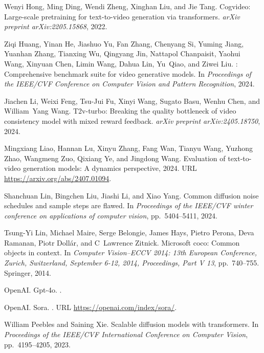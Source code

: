 \documentclass{article} \usepackage{iclr2024_conference,times}
\begin{document}
\begin{thebibliography}{45}
Wenyi Hong, Ming Ding, Wendi Zheng, Xinghan Liu, and Jie Tang.
\newblock Cogvideo: Large-scale pretraining for text-to-video generation via transformers.
\newblock \emph{arXiv preprint arXiv:2205.15868}, 2022.

Ziqi Huang, Yinan He, Jiashuo Yu, Fan Zhang, Chenyang Si, Yuming Jiang, Yuanhan Zhang, Tianxing Wu, Qingyang Jin, Nattapol Chanpaisit, Yaohui Wang, Xinyuan Chen, Limin Wang, Dahua Lin, Yu~Qiao, and Ziwei Liu.
: Comprehensive benchmark suite for video generative models.
\newblock In \emph{Proceedings of the IEEE/CVF Conference on Computer Vision and Pattern Recognition}, 2024.

Jiachen Li, Weixi Feng, Tsu-Jui Fu, Xinyi Wang, Sugato Basu, Wenhu Chen, and William~Yang Wang.
\newblock T2v-turbo: Breaking the quality bottleneck of video consistency model with mixed reward feedback.
\newblock \emph{arXiv preprint arXiv:2405.18750}, 2024.

Mingxiang Liao, Hannan Lu, Xinyu Zhang, Fang Wan, Tianyu Wang, Yuzhong Zhao, Wangmeng Zuo, Qixiang Ye, and Jingdong Wang.
\newblock Evaluation of text-to-video generation models: A dynamics perspective, 2024.
\newblock URL \url{https://arxiv.org/abs/2407.01094}.

Shanchuan Lin, Bingchen Liu, Jiashi Li, and Xiao Yang.
\newblock Common diffusion noise schedules and sample steps are flawed.
\newblock In \emph{Proceedings of the IEEE/CVF winter conference on applications of computer vision}, pp.\  5404--5411, 2024.

Tsung-Yi Lin, Michael Maire, Serge Belongie, James Hays, Pietro Perona, Deva Ramanan, Piotr Doll{\'a}r, and C~Lawrence Zitnick.
\newblock Microsoft coco: Common objects in context.
\newblock In \emph{Computer Vision--ECCV 2014: 13th European Conference, Zurich, Switzerland, September 6-12, 2014, Proceedings, Part V 13}, pp.\  740--755. Springer, 2014.

OpenAI.
\newblock Gpt-4o.
.

OpenAI.
\newblock Sora.
.
\newblock URL \url{https://openai.com/index/sora/}.

William Peebles and Saining Xie.
\newblock Scalable diffusion models with transformers.
\newblock In \emph{Proceedings of the IEEE/CVF International Conference on Computer Vision}, pp.\  4195--4205, 2023.


\end{thebibliography}
\end{document}
